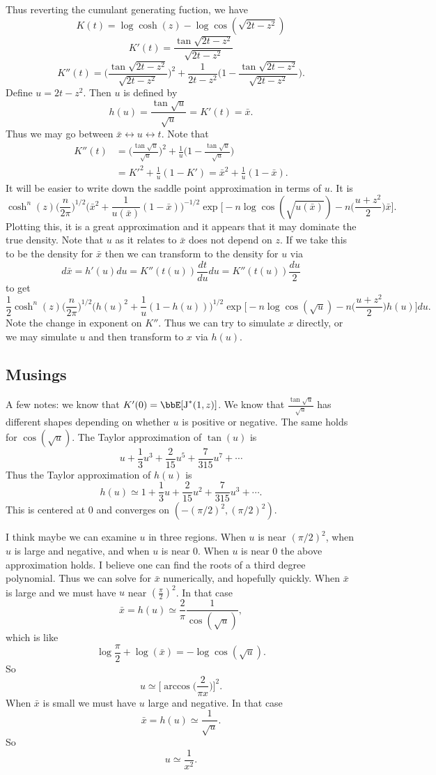 \documentclass[12pt]{article}
\newcommand{\JJ}{\mbox{J}^*}
\newcommand{\utan}[1]{\frac{\tan{\sqrt{#1}}}{\sqrt{#1}}}
\begin{document}
Thus reverting the cumulant generating fuction, we have
\[
K(t) = \log \cosh(z) - \log \cos(\sqrt{2t - z^2})
\]
\[
K'(t) = \utan{2t - z^2}
\]
\[
K''(t) = \Big(\utan{2t-z^2})^2 + \frac{1}{2t - z^2} \Big(1 - \utan{2t-z^2}).
\]
Define $u = 2t - z^2$.  Then $u$ is defined by
\[
h(u) = \utan{u} = K'(t) = \bar x.
\]
Thus we may go between $\bar x \leftrightarrow u \leftrightarrow t$.  Note that
\begin{align*}
  K''(t) & = \Big(\utan{u}\Big)^2 + \frac{1}{u} \Big( 1 - \utan{u} \Big) \\
  & = K'^2 + \frac{1}{u} (1-K') = \bar x^2 + \frac{1}{u} (1 - \bar x).
\end{align*}
It will be easier to write down the saddle point approximation in terms of $u$.
It is
\[
\cosh^n(z)
\Big(\frac{n}{2\pi}\Big)^{1/2} \Big( \bar x^2 + \frac{1}{u(\bar x)} (1 - \bar x)
\Big)^{-1/2} \exp \Big[ -n \log \cos(\sqrt{u(\bar x)}) - n \Big(\frac{u +
  z^2}{2}\Big) \bar x \Big].
\]
Plotting this, it is a great approximation and it appears that it may dominate
the true density.  Note that $u$ as it relates to $\bar x$ does not depend on
$z$.  If we take this to be the density for $\bar x$ then we can transform to
the density for $u$ via
\[
d \bar x = h'(u) du = K''(t(u)) \frac{dt}{du} du = K''(t(u)) \frac{du}{2}
\]
to get
\[
\frac{1}{2} \cosh^n(z)
\Big(\frac{n}{2\pi}\Big)^{1/2} \Big( h(u)^2 + \frac{1}{u} (1 - h(u))
\Big)^{1/2} \exp \Big[ -n \log \cos(\sqrt{u}) - n \Big(\frac{u +
  z^2}{2}\Big) h(u) \Big] du.
\]
Note the change in exponent on $K''$.  Thus we can try to simulate $x$ directly,
or we may simulate $u$ and then transform to $x$ via $h(u)$.

\subsection{Musings}

A few notes: we know that $K'(0) = \bbE[\JJ(1,z)]$.  We know that $\utan{u}$ has
different shapes depending on whether $u$ is positive or negative.  The same
holds for $\cos(\sqrt{u})$.  The Taylor approximation of $\tan(u)$ is
\[
u + \frac{1}{3} u^3 + \frac{2}{15} u^5 + \frac{7}{315} u^7 + \cdots
\]
Thus the Taylor approximation of $h(u)$ is
\[
h(u) \simeq 1 + \frac{1}{3} u + \frac{2}{15} u^2 + \frac{7}{315} u^3 + \cdots.
\]
This is centered at 0 and converges on $(-(\pi/2)^2, (\pi/2)^2)$.

I think maybe we can examine $u$ in three regions.  When $u$ is near
$(\pi/2)^2$, when $u$ is large and negative, and when $u$ is near 0.  When $u$
is near $0$ the above approximation holds.  I believe one can find the roots of
a third degree polynomial.  Thus we can solve for $\bar x$ numerically, and
hopefully quickly.  When $\bar x$ is large and we must have $u$ near
$(\frac{\pi}{2})^2$.  In that case
\[
\bar x = h(u) \simeq \frac{2}{\pi} \frac{1}{\cos(\sqrt{u})},
\]
which is like
\[
\log \frac{\pi}{2} + \log(\bar x) = - \log \cos(\sqrt{u}).
\]
So
\[
u \simeq \Big[ \arccos \Big(\frac{2}{\pi x} \Big) \Big]^2.
\]
When $\bar x$ is small we must have $u$ large and negative.  In that case
\[
\bar x = h(u) \simeq \frac{1}{\sqrt{u}}.
\]
So
\[
u \simeq \frac{1}{x^2}.
\]
\end{document}
